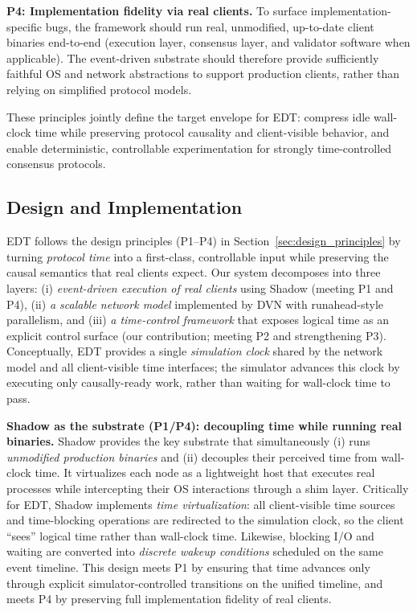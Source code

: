 \smallskip
\noindent\textbf{P4: Implementation fidelity via real clients.}
To surface implementation-specific bugs, the framework should run real, unmodified, up-to-date client binaries end-to-end (execution layer, consensus layer, and validator software when applicable).
The event-driven substrate should therefore provide sufficiently faithful OS and network abstractions to support production clients, rather than relying on simplified protocol models.

\smallskip
These principles jointly define the target envelope for EDT: compress idle wall-clock time while preserving protocol causality and client-visible behavior, and enable deterministic, controllable experimentation for strongly time-controlled consensus protocols.
  



\subsection{Design and Implementation}
\label{subsec:edt-impl}

EDT follows the design principles (P1--P4) in Section~\ref{sec:design_principles} by turning \emph{protocol time} into a first-class, controllable input while preserving the causal semantics that real clients expect.
Our system decomposes into three layers: (i) \emph{event-driven execution of real clients} using Shadow (meeting P1 and P4), (ii) \emph{a scalable network model} implemented by DVN with runahead-style parallelism, and (iii) \emph{a time-control framework} that exposes logical time as an explicit control surface (our contribution; meeting P2 and strengthening P3).
Conceptually, EDT provides a single \emph{simulation clock} shared by the network model and all client-visible time interfaces; the simulator advances this clock by executing only causally-ready work, rather than waiting for wall-clock time to pass.

\smallskip
\noindent\textbf{Shadow as the substrate (P1/P4): decoupling time while running real binaries.}
Shadow provides the key substrate that simultaneously (i) runs \emph{unmodified production binaries} and (ii) decouples their perceived time from wall-clock time.
It virtualizes each node as a lightweight host that executes real processes while intercepting their OS interactions through a shim layer.
Critically for EDT, Shadow implements \emph{time virtualization}: all client-visible time sources and time-blocking operations are redirected to the simulation clock, so the client ``sees'' logical time rather than wall-clock time.
Likewise, blocking I/O and waiting are converted into \emph{discrete wakeup conditions} scheduled on the same event timeline.
This design meets P1 by ensuring that time advances only through explicit simulator-controlled transitions on the unified timeline, and meets P4 by preserving full implementation fidelity of real clients.

